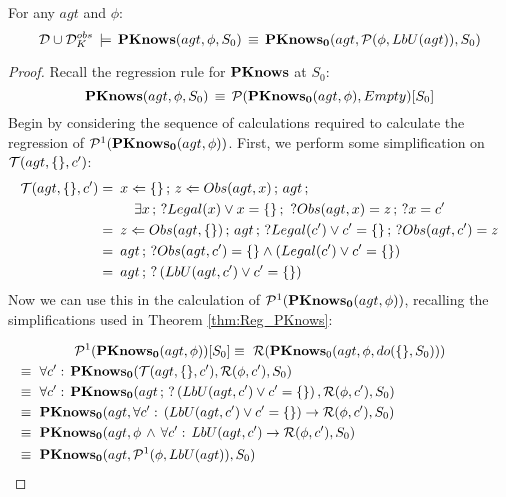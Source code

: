 \begin{lemmaext}
[\ref{lem:Pknows_LbU_S0}] For any $agt$ and $\phi$:\[
\mathcal{D}\cup\mathcal{D}_{K}^{obs}\,\models\,\mathbf{PKnows}(agt,\phi,S_{0})\,\equiv\,\mathbf{PKnows_{0}}(agt,\mathcal{P}(\phi,LbU(agt)),S_{0})\]

\end{lemmaext}
\begin{proof}
Recall the regression rule for $\mathbf{PKnows}$ at $S_{0}$:\[
\mathbf{PKnows}(agt,\phi,S_{0})\,\equiv\,\mathcal{P}(\mathbf{PKnows_{0}}(agt,\phi),Empty)[S_{0}]\]
 Begin by considering the sequence of calculations required to calculate
the regression of $\mathcal{P}^{1}(\mathbf{PKnows_{0}}(agt,\phi))$. First, we perform
some simplification on $\mathcal{T}(agt,\{\},c')$:\begin{align*}
\mathcal{T}(agt,\{\},c')=\,\,\, & x\Leftarrow\{\}\,;\, z\Leftarrow Obs(agt,x)\,;\, agt\,;\\
 & \,\,\,\,\,\,\exists x\,;\,?Legal(x)\vee x=\{\}\,;\,\,?Obs(agt,x)=z\,;\,?x=c'\\
=\,\,\, & z\Leftarrow Obs(agt,\{\})\,;\, agt\,;\,?Legal(c')\vee c'=\{\}\,;\,?Obs(agt,c')=z\\
=\,\,\, & agt\,;\,?Obs(agt,c')=\{\}\wedge\left(Legal(c')\vee c'=\{\}\right)\\
=\,\,\, & agt\,;\,?\left(LbU(agt,c')\vee c'=\{\}\right)\end{align*}
 Now we can use this in the calculation of $\mathcal{P}^{1}(\mathbf{PKnows_{0}}(agt,\phi))$,
recalling the simplifications used in Theorem \ref{thm:Reg_PKnows}:

\begin{multline*}
\Pst^{1}(\PKnowsZ(agt,\phi))[S_{0}]\equiv\,\,\Reg(\PKnows_{0}(agt,\phi,do(\{\},S_{0})))\\
\shoveleft{\equiv\,\,\forall c':\,\PKnowsZ(\Trn(agt,\{\},c'),\Reg(\phi,c'),S_{0})}\\
\shoveleft{\equiv\,\,\forall c':\,\PKnowsZ(agt\,;\,?\left(\LbU(agt,c')\vee c'=\{\}\right),\Reg(\phi,c'),S_{0})}\\
\shoveleft{\equiv\,\,\PKnowsZ(agt,\forall c':\,\left(\LbU(agt,c')\vee c'=\{\}\right)\rightarrow\Reg(\phi,c'),S_{0})}\\
\shoveleft{\equiv\,\,\PKnowsZ(agt,\phi\,\wedge\,\forall c':\, LbU(agt,c')\rightarrow\Reg(\phi,c'),S_{0})}\\
\shoveleft{\equiv\,\,\PKnowsZ(agt,\Pst^{1}(\phi,\LbU(agt)),S_{0})}\,\,\,\,\,\,\,\,\,\,\,\,\,\,\,\,\,\,\,\,\,\,\,\,\,\,\,\,\,\,\,\,\,\,\,\,\,\,\,\,\,\,\,\,\,\,\,\,\,\,\,\,\,\,\,\,\,\,\,\,\,\,\,\,\,\,\,\,\,\,\,\,\,\,\,\,\,\,\,\,\,\,\,\,\,\,\,\,\,\,\,\,\,\,\,\,\,\,\,\,\,\,\,\,\,\,\,\,\,\,\,\,\,\end{multline*}



\end{proof}
